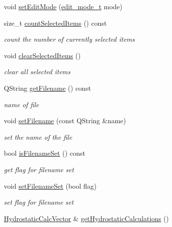 \begin{DoxyCompactItemize}
\item 
void \hyperlink{classShipCAD_1_1ShipCADModel_a2636160d900b8d8b00802ae78ee87925}{set\+Edit\+Mode} (\hyperlink{namespaceShipCAD_a66144e3f3a53da01f51c9bdb94fcae31}{edit\+\_\+mode\+\_\+t} mode)
\item 
size\+\_\+t \hyperlink{classShipCAD_1_1ShipCADModel_a859625224375157010421a69f96ec639}{count\+Selected\+Items} () const 
\begin{DoxyCompactList}\small\item\em count the number of currently selected items \end{DoxyCompactList}\item 
void \hyperlink{classShipCAD_1_1ShipCADModel_a690bd5621d82d15a28ea59c09ded99d8}{clear\+Selected\+Items} ()
\begin{DoxyCompactList}\small\item\em clear all selected items \end{DoxyCompactList}\item 
Q\+String \hyperlink{classShipCAD_1_1ShipCADModel_a4c29a9dd9e31c652a82b6398c8f7b983}{get\+Filename} () const 
\begin{DoxyCompactList}\small\item\em name of file \end{DoxyCompactList}\item 
void \hyperlink{classShipCAD_1_1ShipCADModel_a07daf75d876f80296f841f5c8d2327cb}{set\+Filename} (const Q\+String \&name)
\begin{DoxyCompactList}\small\item\em set the name of the file \end{DoxyCompactList}\item 
bool \hyperlink{classShipCAD_1_1ShipCADModel_a9aa140f98f5f02a30743e2b9ce3d7d28}{is\+Filename\+Set} () const 
\begin{DoxyCompactList}\small\item\em get flag for filename set \end{DoxyCompactList}\item 
void \hyperlink{classShipCAD_1_1ShipCADModel_a960f3e97ef2aa847c9bb7cdc7731cd39}{set\+Filename\+Set} (bool flag)
\begin{DoxyCompactList}\small\item\em set flag for filename set \end{DoxyCompactList}\item 
\hyperlink{namespaceShipCAD_a0c7b012d8868cbb43871cf0bf303ccc6}{Hydrostatic\+Calc\+Vector} \& \hyperlink{classShipCAD_1_1ShipCADModel_aafc30dd7d6b9db4ccfc7bf1c4e2b3b11}{get\+Hydrostatic\+Calculations} ()

\end{DoxyCompactItemize}
